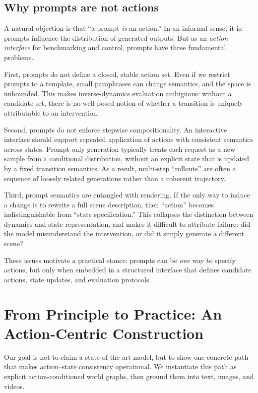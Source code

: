 \documentclass{article}
\theoremstyle{plain}
\theoremstyle{definition}
\theoremstyle{remark}
\begin{document}
\subsection{Why prompts are not actions}
A natural objection is that ``a prompt \emph{is} an action.'' In an informal sense, it is: prompts influence the distribution of generated outputs. But as an \emph{action interface} for benchmarking and control, prompts have three fundamental problems.

First, prompts do not define a closed, stable action set. Even if we restrict prompts to a template, small paraphrases can change semantics, and the space is unbounded. This makes inverse-dynamics evaluation ambiguous: without a candidate set, there is no well-posed notion of whether a transition is uniquely attributable to an intervention.

Second, prompts do not enforce stepwise compositionality. An interactive interface should support repeated application of actions with consistent semantics across states. Prompt-only generation typically treats each request as a new sample from a conditional distribution, without an explicit state that is updated by a fixed transition semantics. As a result, multi-step ``rollouts'' are often a sequence of loosely related generations rather than a coherent trajectory.

Third, prompt semantics are entangled with rendering. If the only way to induce a change is to rewrite a full scene description, then ``action'' becomes indistinguishable from ``state specification.'' This collapses the distinction between dynamics and state representation, and makes it difficult to attribute failure: did the model misunderstand the intervention, or did it simply generate a different scene?

These issues motivate a practical stance: prompts can be \emph{one} way to specify actions, but only when embedded in a structured interface that defines candidate actions, state updates, and evaluation protocols.

\section{From Principle to Practice: An Action-Centric Construction}
\label{sec:construction}
Our goal is not to claim a state-of-the-art model, but to show one concrete path that makes action--state consistency operational. We instantiate this path as explicit action-conditioned world graphs, then ground them into text, images, and videos.
\end{document}
